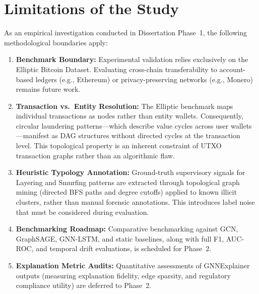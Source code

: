 \section{Limitations of the Study}
\label{sec:limitations}

As an empirical investigation conducted in Dissertation Phase~1, the following methodological boundaries apply:

\begin{enumerate}
	\item \textbf{Benchmark Boundary:} Experimental validation relies exclusively on the Elliptic Bitcoin Dataset. Evaluating cross-chain transferability to account-based ledgers (e.g., Ethereum) or privacy-preserving networks (e.g., Monero) remains future work.

	\item \textbf{Transaction vs.\ Entity Resolution:} The Elliptic benchmark maps individual transactions as nodes rather than entity wallets. Consequently, circular laundering patterns—which describe value cycles across user wallets—manifest as DAG structures without directed cycles at the transaction level. This topological property is an inherent constraint of UTXO transaction graphs rather than an algorithmic flaw.

	\item \textbf{Heuristic Typology Annotation:} Ground-truth supervisory signals for Layering and Smurfing patterns are extracted through topological graph mining (directed BFS paths and degree cutoffs) applied to known illicit clusters, rather than manual forensic annotations. This introduces label noise that must be considered during evaluation.

	\item \textbf{Benchmarking Roadmap:} Comparative benchmarking against GCN, GraphSAGE, GNN-LSTM, and static baselines, along with full F1, AUC-ROC, and temporal drift evaluations, is scheduled for Phase~2.

	\item \textbf{Explanation Metric Audits:} Quantitative assessments of GNNExplainer outputs (measuring explanation fidelity, edge sparsity, and regulatory compliance utility) are deferred to Phase~2.
\end{enumerate}
